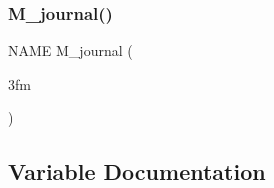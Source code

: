 \subsubsection{\texorpdfstring{M\+\_\+journal()}{M\_journal()}}
{\footnotesize\ttfamily N\+A\+ME M\+\_\+journal (\begin{DoxyParamCaption}\item[{3fm}]{ }\end{DoxyParamCaption})}



\subsection{Variable Documentation}
\mbox{\label{M__journal_83_8txt_af78cd777fb46433462e3afacb9c375fd}} 
